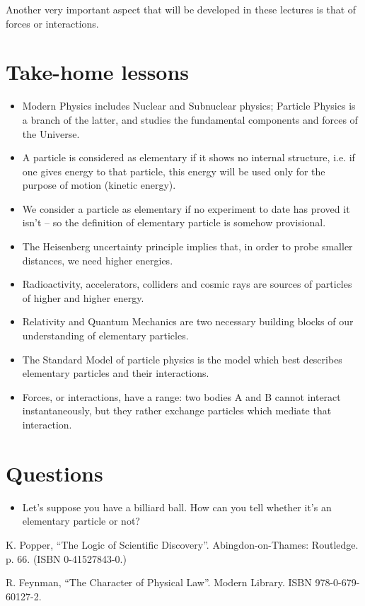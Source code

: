 Another very important aspect that will be developed in these lectures is that of forces or interactions.


\section*{Take-home lessons}
\begin{itemize}
    \item Modern Physics includes Nuclear and Subnuclear physics; Particle Physics is a branch of the latter, and studies the fundamental components and forces of the Universe.
    \item A particle is considered as elementary if it shows no internal structure, i.e. if one gives energy to that particle, this energy will be used only for the purpose of motion (kinetic energy).
    \item We consider a particle as elementary if no experiment to date has proved it isn't -- so the definition of elementary particle is somehow provisional.
    \item The Heisenberg uncertainty principle implies that, in order to probe smaller distances, we need higher energies.
    \item Radioactivity, accelerators, colliders and cosmic rays are sources of particles of higher and higher energy.
    \item Relativity and Quantum Mechanics are two necessary building blocks of our understanding of elementary particles.
    \item The Standard Model of particle physics is the model which best describes elementary particles and their interactions.
    \item Forces, or interactions, have a range: two bodies A and B cannot interact instantaneously, but they rather exchange particles which mediate that interaction.
\end{itemize}
\section*{Questions}
\begin{itemize}
    \item Let's suppose you have a billiard ball. How can you tell whether it's an elementary particle or not?
\end{itemize}


\begin{thebibliography}{99.}%
 K. Popper, ``The Logic of Scientific Discovery''. Abingdon-on-Thames: Routledge. p. 66. (ISBN 0-41527843-0.)

 R. Feynman, ``The Character of Physical Law''. Modern Library. ISBN 978-0-679-60127-2.
\end{thebibliography}
